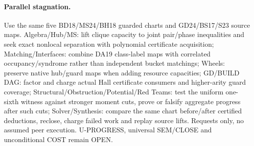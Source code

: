 \documentclass[11pt]{article}
\begin{document}
\paragraph{Parallel stagnation.}
Use the same five BD18/MS24/BH18 guarded charts and GD24/BS17/S23 source maps. Algebra/Hub/MS: lift clique capacity to joint pair/phase inequalities and seek exact nonlocal separation with polynomial certificate acquisition; Matching/Interfaces: combine DA19 class-label maps with correlated occupancy/syndrome rather than independent bucket matchings; Wheels: preserve native hub/guard maps when adding resource capacities; GD/BUILD DAG: factor and charge actual Hall certificate consumers and higher-arity guard coverage; Structural/Obstruction/Potential/Red Teams: test the uniform one-sixth witness against stronger moment cuts, prove or falsify aggregate progress after such cuts; Solver/Synthesis: compare the same chart before/after certified deductions, reclose, charge failed work and replay source lifts. Requests only, no assumed peer execution. U-PROGRESS, universal SEM/CLOSE and unconditional COST remain OPEN.
\end{document}
